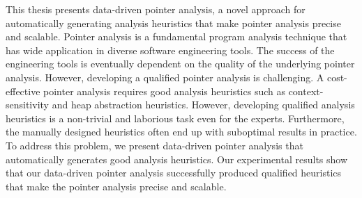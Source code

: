 This thesis presents data-driven pointer analysis, a novel approach for automatically generating analysis heuristics that make pointer analysis precise and scalable. 
Pointer analysis is a fundamental program analysis technique that has wide application in diverse software engineering tools. The success of the engineering tools is eventually dependent on the quality of the underlying pointer analysis.
However, developing a qualified pointer analysis is challenging.
A cost-effective pointer analysis requires good analysis heuristics such as context-sensitivity and heap abstraction heuristics.
However, developing qualified analysis heuristics is a non-trivial and laborious task even for the experts. Furthermore, the manually designed heuristics often end up with suboptimal results in practice.
To address this problem, we present data-driven pointer analysis that automatically generates good analysis heuristics.
Our experimental results show that our data-driven pointer analysis successfully produced qualified heuristics that make the pointer analysis precise and scalable.








